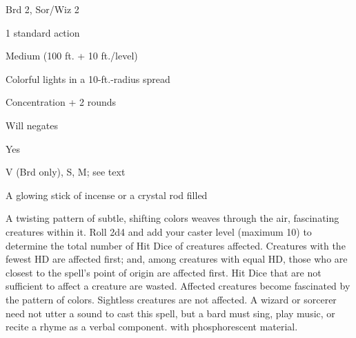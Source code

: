 
\begin{description*}
\item[Level:] Brd 2, Sor/Wiz 2
\item[Casting Time:] 1 standard action
\item[Range:] Medium (100 ft. + 10 ft./level)
\item[Effect:] Colorful lights in a 10-ft.-radius spread
\item[Duration:] Concentration + 2 rounds
\item[Saving Throw:] Will negates
\item[Spell Resistance:] Yes
\item[Components:] V (Brd only), S, M; see text
\item[Arcane Material Component:] A glowing stick of incense or a crystal rod filled
\end{description*}

A twisting pattern of subtle, shifting colors weaves through the air, fascinating
creatures within it. Roll 2d4 and add your caster level (maximum 10) to determine
the total number of Hit Dice of creatures affected. Creatures with the fewest HD
are affected first; and, among creatures with equal HD, those who are closest to
the spell's point of origin are affected first. Hit Dice that are not sufficient
to affect a creature are wasted. Affected creatures become fascinated by the pattern
of colors. Sightless creatures are not affected.
A wizard or sorcerer need not utter a sound to cast this spell, but a bard must
sing, play music, or recite a rhyme as a verbal component.
with phosphorescent material.